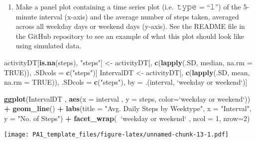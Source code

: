 \documentclass[
]{article}
\newenvironment{Shaded}{\begin{snugshade}}{\end{snugshade}}
\newcommand{\DataTypeTok}[1]{\textcolor[rgb]{0.13,0.29,0.53}{#1}}
\newcommand{\DecValTok}[1]{\textcolor[rgb]{0.00,0.00,0.81}{#1}}
\newcommand{\KeywordTok}[1]{\textcolor[rgb]{0.13,0.29,0.53}{\textbf{#1}}}
\newcommand{\NormalTok}[1]{#1}
\newcommand{\OperatorTok}[1]{\textcolor[rgb]{0.81,0.36,0.00}{\textbf{#1}}}
\newcommand{\OtherTok}[1]{\textcolor[rgb]{0.56,0.35,0.01}{#1}}
\newcommand{\StringTok}[1]{\textcolor[rgb]{0.31,0.60,0.02}{#1}}
\providecommand{\tightlist}{%
  \setlength{\itemsep}{0pt}\setlength{\parskip}{0pt}}
\begin{document}
\begin{enumerate}
\def\labelenumi{\arabic{enumi}.}
\setcounter{enumi}{1}
\tightlist
\item
  Make a panel plot containing a time series plot (i.e.~𝚝𝚢𝚙𝚎 = ``𝚕'') of
  the 5-minute interval (x-axis) and the average number of steps taken,
  averaged across all weekday days or weekend days (y-axis). See the
  README file in the GitHub repository to see an example of what this
  plot should look like using simulated data.
\end{enumerate}

\begin{Shaded}
\begin{Highlighting}[]
\NormalTok{activityDT[}\KeywordTok{is.na}\NormalTok{(steps), }\StringTok{"steps"}\NormalTok{] <-}\StringTok{ }\NormalTok{activityDT[, }\KeywordTok{c}\NormalTok{(}\KeywordTok{lapply}\NormalTok{(.SD, median, }\DataTypeTok{na.rm =} \OtherTok{TRUE}\NormalTok{)), .SDcols =}\StringTok{ }\KeywordTok{c}\NormalTok{(}\StringTok{"steps"}\NormalTok{)]}
\NormalTok{IntervalDT <-}\StringTok{ }\NormalTok{activityDT[, }\KeywordTok{c}\NormalTok{(}\KeywordTok{lapply}\NormalTok{(.SD, mean, }\DataTypeTok{na.rm =} \OtherTok{TRUE}\NormalTok{)), .SDcols =}\StringTok{ }\KeywordTok{c}\NormalTok{(}\StringTok{"steps"}\NormalTok{), by =}\StringTok{ }\NormalTok{.(interval, }\StringTok{`}\DataTypeTok{weekday or weekend}\StringTok{`}\NormalTok{)] }

\KeywordTok{ggplot}\NormalTok{(IntervalDT , }\KeywordTok{aes}\NormalTok{(}\DataTypeTok{x =}\NormalTok{ interval , }\DataTypeTok{y =}\NormalTok{ steps, }\DataTypeTok{color=}\StringTok{`}\DataTypeTok{weekday or weekend}\StringTok{`}\NormalTok{)) }\OperatorTok{+}\StringTok{ }\KeywordTok{geom_line}\NormalTok{() }\OperatorTok{+}\StringTok{ }\KeywordTok{labs}\NormalTok{(}\DataTypeTok{title =} \StringTok{"Avg. Daily Steps by Weektype"}\NormalTok{, }\DataTypeTok{x =} \StringTok{"Interval"}\NormalTok{, }\DataTypeTok{y =} \StringTok{"No. of Steps"}\NormalTok{) }\OperatorTok{+}\StringTok{ }\KeywordTok{facet_wrap}\NormalTok{(}\OperatorTok{~}\StringTok{`}\DataTypeTok{weekday or weekend}\StringTok{`}\NormalTok{ , }\DataTypeTok{ncol =} \DecValTok{1}\NormalTok{, }\DataTypeTok{nrow=}\DecValTok{2}\NormalTok{)}
\end{Highlighting}
\end{Shaded}

\texttt{[image: PA1\_template\_files/figure-latex/unnamed-chunk-13-1.pdf]}
\end{document}
